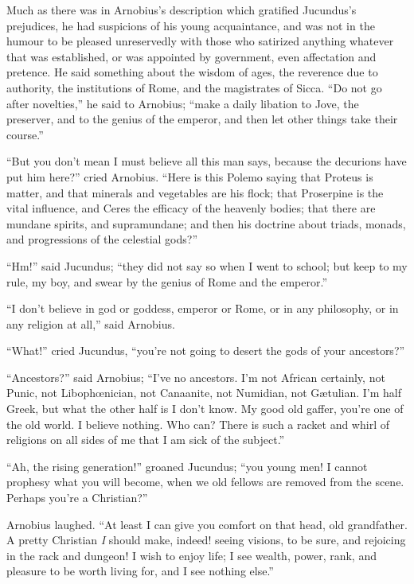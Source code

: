 Much as there was in Arnobius's description which gratified
Jucundus's prejudices, he had suspicions of his young acquaintance,
and was not in the humour to be pleased unreservedly with those who
satirized anything whatever that was established, or was appointed by
government, even affectation and pretence. He said something about the
wisdom of ages, the reverence due to authority, the institutions of
Rome, and the magistrates of Sicca. ``Do not go after
novelties,'' he said to Arnobius; ``make a daily libation to
Jove, the preserver, and to the genius of the emperor, and then let
other things take their course.''

``But you don't mean I must believe all this man says, because
the decurions have put him here?'' cried Arnobius. ``Here is
this Polemo saying that Proteus is matter, and that minerals and
vegetables are his flock; that Proserpine is the vital influence, and
Ceres the efficacy of the heavenly bodies; that there are mundane
spirits, and supramundane; and then his doctrine about triads,
monads, and progressions of the celestial gods?''

``Hm!'' said Jucundus; ``they did not say so when I
went to school; but keep to my rule, my boy, and swear by the genius
of Rome and the emperor.''

``I don't believe in god or goddess, emperor or Rome, or in any
philosophy, or in any religion at all,'' said Arnobius.

``What!'' cried Jucundus, ``you're not going to desert
the gods of your ancestors?''

``Ancestors?'' said Arnobius; ``I've no ancestors. I'm
not African certainly, not Punic, not Libophœnician, not Canaanite,
not Numidian, not Gætulian. I'm half Greek, but what the other half
is I don't know. My good old gaffer, you're one of the old world. I
believe nothing. Who can? There is such a racket and whirl of
religions on all sides of me that I am sick of the subject.''

``Ah, the rising generation!'' groaned Jucundus; ``you
young men! I cannot prophesy what you will become, when we old fellows
are removed from the scene. Perhaps you're a Christian?''

Arnobius laughed. ``At least I can give you comfort on that
head, old grandfather. A pretty Christian \emph{I} should make,
indeed! seeing visions, to be sure, and rejoicing in the rack and
dungeon! I wish to enjoy life; I see wealth, power, rank, and pleasure
to be worth living for, and I see nothing else.''

